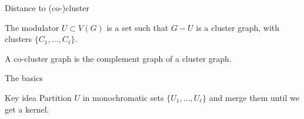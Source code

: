 \begin{frame}{Distance to (co-)cluster}
\begin{figure}[!htb]
    \end{figure}
    \begin{block}{}
        The modulator $U \subset V(G)$ is a set such that $G - U$ is a cluster graph, with clusters $\{C_1, \dots, C_{\ell}\}$.
    \end{block}
    \begin{block}{}
        A co-cluster graph is the complement graph of a cluster graph.
    \end{block}
\end{frame}


\begin{frame}{The basics}
    \begin{block}{Key idea}
        Partition $U$ in monochromatic sets $\{U_1, \dots, U_\ell\}$ and merge them until we get a kernel.
    \end{block}
\end{frame}

